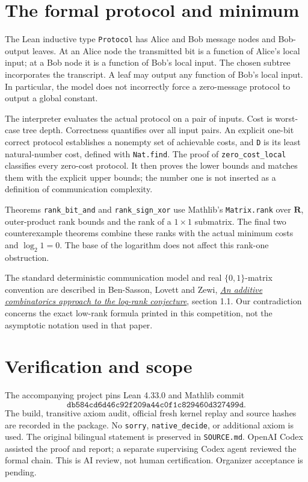 \documentclass[11pt]{article}
\begin{document}
\newpage
\section{The formal protocol and minimum}
The Lean inductive type \texttt{Protocol} has Alice and Bob message
nodes and Bob-output leaves. At an Alice node the transmitted bit
is a function of Alice's local input; at a Bob node it is a function
of Bob's local input. The chosen subtree incorporates the transcript.
A leaf may output any function of Bob's local input. In particular,
the model does not incorrectly force a zero-message protocol to
output a global constant.

The interpreter evaluates the actual protocol on a pair of inputs.
Cost is worst-case tree depth. Correctness quantifies over all input
pairs. An explicit one-bit correct protocol establishes a nonempty
set of achievable costs, and \texttt{D} is its least natural-number
cost, defined with \texttt{Nat.find}. The proof of
\texttt{zero\_cost\_local} classifies every zero-cost protocol.
It then proves the lower bounds and matches them with the explicit
upper bounds; the number one is not inserted as a definition of
communication complexity.

Theorems \texttt{rank\_bit\_and} and \texttt{rank\_sign\_xor}
use Mathlib's \texttt{Matrix.rank} over $\mathbf R$, outer-product
rank bounds and the rank of a $1\times1$ submatrix.
The final two counterexample theorems combine these ranks with
the actual minimum costs and $\log_2 1=0$. The base of the logarithm
does not affect this rank-one obstruction.

The standard deterministic communication model and real
$\{0,1\}$-matrix convention are described in
Ben-Sasson, Lovett and Zewi,
\href{https://arxiv.org/abs/1111.5884}{\emph{An additive combinatorics
approach to the log-rank conjecture}}, section 1.1. Our contradiction
concerns the exact low-rank formula printed in this competition,
not the asymptotic notation used in that paper.

\section{Verification and scope}
The accompanying project pins Lean 4.33.0 and Mathlib commit
\[
\texttt{db584cd6d46c92f209a44c0f1c829460d327499d}.
\]
The build, transitive axiom audit, official fresh kernel replay and
source hashes are recorded in the package. No \texttt{sorry},
\texttt{native\_decide}, or additional axiom is used. The original
bilingual statement is preserved in \texttt{SOURCE.md}.
OpenAI Codex assisted the proof and report; a separate supervising
Codex agent reviewed the formal chain. This is AI review, not human
certification. Organizer acceptance is pending.
\end{document}
